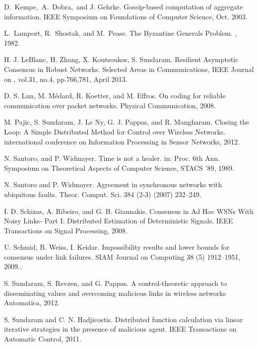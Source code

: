 \documentclass{llncs}
\begin{document}
\begin{thebibliography}{10}
D.~Kempe,~A.~Dobra,~and J. Gehrke.
\newblock Gossip-based computation of aggregate information.
\newblock IEEE Symposium on Foundations of Computer Science, Oct. 2003.

L.~Lamport, R.~Shostak, and M.~Pease.
\newblock The Byzantine Generals Problem.
, 1982.

H. J. LeBlanc, H. Zhang, X. Koutsoukos, S. Sundaram.
\newblock Resilient Asymptotic Consensus in Robust Networks.
\newblock Selected Areas in Communications, IEEE Journal on , vol.31, no.4, pp.766,781, April 2013.

D. S. Lun, M. M{\'e}dard, R. Koetter, and M. Effros.
\newblock On coding for reliable communication over packet networks.
\newblock Physical Communication, 2008.

M. Pajic, S. Sundaram, J. Le Ny, G. J. Pappas, and R. Mangharam.
\newblock Closing the Loop: A Simple Distributed Method for Control
over Wireless Networks.
\newblock international conference on Information Processing in Sensor Networks, 2012.


N. Santoro, and P. Widmayer. 
\newblock Time is not a healer.
\newblock in: Proc. 6th Ann. Symposium on Theoretical Aspects of Computer Science, STACS '89, 1989.

N. Santoro and P. Widmayer.
\newblock Agreement in synchronous networks with ubiquitous faults.
\newblock Theor. Comput. Sci. 384 (2-3) (2007) 232–249.

I. D. Schizas, A. Ribeiro, and G. B. Giannakis. 
\newblock Consensus in Ad Hoc WSNs With Noisy Links- Part I: Distributed Estimation of Deterministic Signals.
\newblock IEEE Transactions on Signal Processing, 2008.

U. Schmid, B. Weiss, I. Keidar.
\newblock Impossibility results and lower bounds for consensus under link failures.
\newblock SIAM Journal on Computing 38 (5) 1912–1951, 2009..

S. Sundaram, S. Revzen, and G. Pappas.
\newblock A control-theoretic approach to disseminating values and overcoming malicious links in wireless networks
\newblock Automatica, 2012.

S. Sundaram and C. N. Hadjicostis.
\newblock Distributed function calculation via linear iterative strategies in the presence of malicious agent.
\newblock IEEE Transactions on Automatic Control, 2011.


\end{thebibliography}
\end{document}
